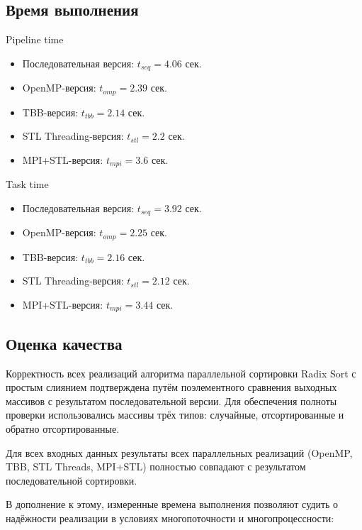 \documentclass[a4paper,12pt]{article}
\begin{document}
\subsection{Время выполнения}
Pipeline time
    \begin{itemize}
        \item Последовательная версия: $t_{seq} = 4.06$ сек.
        \item OpenMP-версия: $t_{omp} = 2.39$ сек.
        \item TBB-версия: $t_{tbb} = 2.14$ сек.
        \item STL Threading-версия: $t_{stl} = 2.2$ сек.
        \item MPI+STL-версия: $t_{mpi} = 3.6$ сек.
    \end{itemize}
Task time
    \begin{itemize}
        \item Последовательная версия: $t_{seq} = 3.92$ сек.
        \item OpenMP-версия: $t_{omp} = 2.25$ сек.
        \item TBB-версия: $t_{tbb} = 2.16$ сек.
        \item STL Threading-версия: $t_{stl} = 2.12$ сек.
        \item MPI+STL-версия: $t_{mpi} = 3.44$ сек.
    \end{itemize}


\subsection{Оценка качества}

Корректность всех реализаций алгоритма параллельной сортировки Radix Sort с простым слиянием подтверждена путём поэлементного сравнения выходных массивов с результатом последовательной версии. Для обеспечения полноты проверки использовались массивы трёх типов: случайные, отсортированные и обратно отсортированные.

Для всех входных данных результаты всех параллельных реализаций (OpenMP, TBB, STL Threads, MPI+STL) полностью совпадают с результатом последовательной сортировки.


В дополнение к этому, измеренные времена выполнения позволяют судить о надёжности реализации в условиях многопоточности и многопроцессности:
\end{document}
